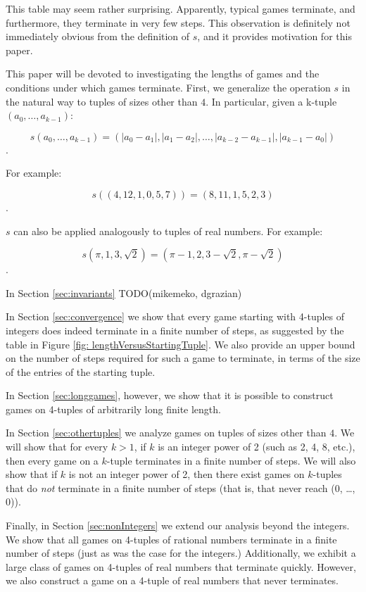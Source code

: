 \documentclass[12pt]{amsart}
\newcommand{\diff}{s}
\begin{document}
This table may seem rather surprising. Apparently, typical games terminate, and furthermore, they terminate in very few steps. This observation is definitely not immediately obvious from the definition of $\diff$, and it provides motivation for this paper.

This paper will be devoted to investigating the lengths of games and the conditions under which games terminate. First, we generalize the operation $\diff$ in the natural way to tuples of sizes other than $4$. In particular, given a k-tuple $(a_0, \ldots, a_{k-1})$:

$$\diff(a_0, \ldots, a_{k-1}) = (|a_0 - a_1|, |a_1 - a_2|, \ldots, |a_{k-2} - a_{k-1}|, |a_{k-1} - a_0|)$$.

For example:

$$\diff((4, 12, 1, 0, 5, 7)) = (8, 11, 1, 5, 2, 3)$$.

$\diff$ can also be applied analogously to tuples of real numbers. For example:

$$\diff(\pi, 1, 3, \sqrt{2}) = (\pi - 1, 2, 3 - \sqrt{2}, \pi - \sqrt{2})$$.

In Section \ref{sec:invariants} TODO(mikemeko, dgrazian)

In Section \ref{sec:convergence} we show that every game starting with 4-tuples of integers does indeed terminate in a finite number of steps, as suggested by the table in Figure \ref{fig: lengthVersusStartingTuple}. We also provide an upper bound on the number of steps required for such a game to terminate, in terms of the size of the entries of the starting tuple.

In Section \ref{sec:longgames}, however, we show that it is possible to construct games on 4-tuples of arbitrarily long finite length. 

In Section \ref{sec:othertuples} we analyze games on tuples of sizes other than $4$. We will show that for every $k > 1$, if $k$ is an integer power of 2 (such as 2, 4, 8, etc.), then every game on a $k$-tuple terminates in a finite number of steps. We will also show that if $k$ is not an integer power of 2, then there exist games on $k$-tuples that do \textit{not} terminate in a finite number of steps (that is, that never reach (0, \ldots, 0)).

Finally, in Section \ref{sec:nonIntegers} we extend our analysis beyond the integers. We show that all games on 4-tuples of rational numbers terminate in a finite number of steps (just as was the case for the integers.) Additionally, we exhibit a large class of games on 4-tuples of real numbers that terminate quickly. However, we also construct a game on a 4-tuple of real numbers that never terminates.
\end{document}

